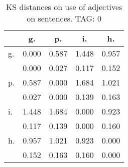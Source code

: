 \begin{table}[h!]
\begin{center}
\begin{tabular}{| l | c | c | c | c |}\hline
 & g. & p. & i. & h. \\\hline
g. & 0.000  & 0.587  & 1.448  & 0.957 \\\hline
 & 0.000  & 0.027  & 0.117  & 0.152 \\\hline
p. & 0.587  & 0.000  & 1.684  & 1.021 \\\hline
 & 0.027  & 0.000  & 0.139  & 0.163 \\\hline
i. & 1.448  & 1.684  & 0.000  & 0.923 \\\hline
 & 0.117  & 0.139  & 0.000  & 0.160 \\\hline
h. & 0.957  & 1.021  & 0.923  & 0.000 \\\hline
 & 0.152  & 0.163  & 0.160  & 0.000 \\\hline
\end{tabular}
\caption{KS distances on use of adjectives on sentences. TAG: 0}
\end{center}
\end{table}